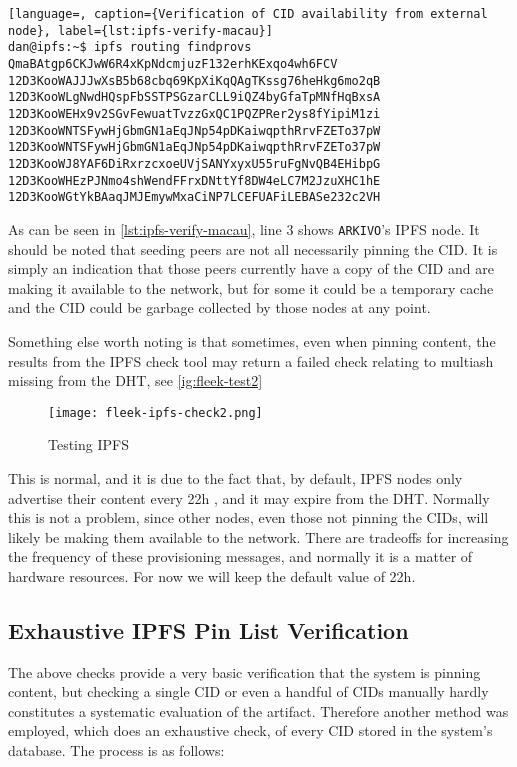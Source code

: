 \begin{lstlisting}[language=, caption={Verification of CID availability from external node}, label={lst:ipfs-verify-macau}] 
dan@ipfs:~$ ipfs routing findprovs QmaBAtgp6CKJwW6R4xKpNdcmjuzF132erhKExqo4wh6FCV
12D3KooWAJJJwXsB5b68cbq69KpXiKqQAgTKssg76heHkg6mo2qB
12D3KooWLgNwdHQspFbSSTPSGzarCLL9iQZ4byGfaTpMNfHqBxsA
12D3KooWEHx9v2SGvFewuatTvzzGxQC1PQZPRer2ys8fYipiM1zi
12D3KooWNTSFywHjGbmGN1aEqJNp54pDKaiwqpthRrvFZETo37pW
12D3KooWNTSFywHjGbmGN1aEqJNp54pDKaiwqpthRrvFZETo37pW
12D3KooWJ8YAF6DiRxrzcxoeUVjSANYxyxU55ruFgNvQB4EHibpG
12D3KooWHEzPJNmo4shWendFFrxDNttYf8DW4eLC7M2JzuXHC1hE
12D3KooWGtYkBAaqJMJEmywMxaCiNP7LCEFUAFiLEBASe232c2VH
\end{lstlisting}

As can be seen in \autoref{lst:ipfs-verify-macau}, line 3 shows \texttt{ARKIVO}'s IPFS node. It should be noted that seeding peers are not all necessarily pinning the CID. It is simply an indication that those peers currently have a copy of the CID and are making it available to the network, but for some it could be a temporary cache and the CID could be garbage collected by those nodes at any point.

Something else worth noting is that sometimes, even when pinning content, the results from the IPFS check tool may return a failed check relating to multiash missing from the DHT, see \autoref{ig:fleek-test2}

\begin{figure}[H]
    \centering
    \texttt{[image: fleek-ipfs-check2.png]}
    \caption[Testing IPFS]{Testing IPFS}
    \label{fig:fleek-test2}
\end{figure}

This is normal, and it is due to the fact that, by default, IPFS nodes only advertise their content every 22h \cite{KuboConfigFile2024}, and it may expire from the DHT. Normally this is not a problem, since other nodes, even those not pinning the CIDs, will likely be making them available to the network. There are tradeoffs for increasing the frequency of these provisioning messages, and normally it is a matter of hardware resources. For now we will keep the default value of 22h.


\subsection{Exhaustive IPFS Pin List Verification}

The above checks provide a very basic verification that the system is pinning content, but checking a single CID or even a handful of CIDs manually hardly constitutes a systematic evaluation of the artifact.
Therefore another method was employed, which does an exhaustive check, of every CID stored in the system's database.
The process is as follows:

